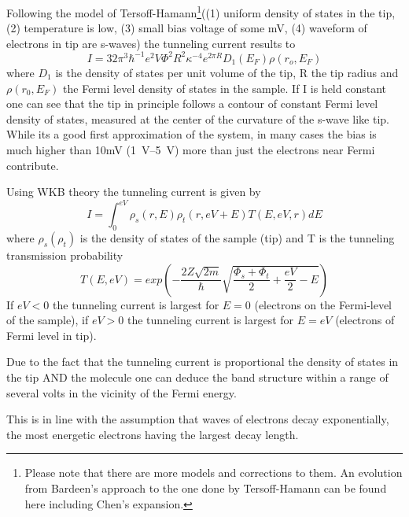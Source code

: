 Following the model of  Tersoff-Hamann\footnote{Please note that there are more models and corrections to them. An evolution from Bardeen's approach to the one done by Tersoff-Hamann can be found here \cite{lounis_theory_2014} including Chen’s expansion.}((1) uniform density of states in the tip, (2) temperature is low, (3) small bias voltage of some mV, (4) waveform of electrons in tip are s-waves) the tunneling current results to 
$$I=32\pi^3\hbar^{-1}e^2V\Phi^2 R^2\kappa^{-4}e^{2\pi R}D_1(E_F)\rho(r_o,E_F)$$ where $D_1$ is the density of states per unit volume of the tip, R the tip radius and $\rho(r_0,E_F)$ the Fermi level density of states in the sample. If I is held constant one can see that the tip in principle follows a contour of constant Fermi level density of states, measured at the center of the curvature of the s-wave like tip. While its a good first approximation of the system, in many cases the bias is much higher than 10mV (\SIrange{1}{5}{\V}) more than just the electrons near Fermi contribute.

Using  WKB theory the tunneling current is given by
\begin{equation}
I=\int_0^{eV}\rho_s(r,E)\rho_t(r,eV+E)T(E,eV,r)dE
\label{WKB}
\end{equation}
where $\rho_s(\rho_t)$ is the density of states of the sample (tip) and T is the tunneling transmission probability
\begin{equation}
T(E,eV)=exp\left(-\frac{2Z\sqrt{2m}}{\hbar}\sqrt{\frac{\Phi_s+\Phi_t}{2}+\frac{eV}{2}-E}\right)
\label{Transmission-function} 
\end{equation}
If $eV<0$ the tunneling current is largest for $E=0$ (electrons on the Fermi-level of the sample), if $eV>0$ the tunneling current is largest for $E=eV$ (electrons of Fermi level in tip).

Due to the fact that the tunneling current is proportional the density of states in the tip AND the molecule one can deduce the band structure within a range of several volts in the vicinity of the Fermi energy.

This is in line with the assumption that waves of electrons decay exponentially, the most energetic electrons having the largest decay length.

